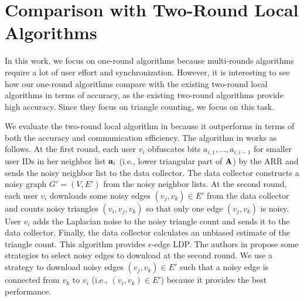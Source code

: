 \section{Comparison with Two-Round Local Algorithms}
\label{chap3-sec:two-round}
In this work, we focus on one-round algorithms because multi-rounds algorithms require a lot of user effort and synchronization.
However, it is interesting to see how our one-round algorithms compare with the existing two-round local algorithms \cite{Imola_USENIX21,Imola_USENIX22} in terms of accuracy, as the existing two-round algorithms provide high accuracy.
Since they focus on triangle counting, we focus on this task.

We evaluate the two-round local algorithm in \cite{Imola_USENIX22} because it outperforms \cite{Imola_USENIX21} in terms of both the accuracy and communication efficiency.
The algorithm in \cite{Imola_USENIX22} works as follows.
At the first round, each user $v_i$ obfuscates bits $a_{i,1}, \ldots, a_{i,i-1}$ for smaller user IDs in her neighbor list $\mathbf{a}_i$ (i.e., lower triangular part of $\mathbf{A}$) by the ARR and sends the noisy neighbor list to the data collector.
The data collector constructs a noisy graph $G'=(V,E')$ from the noisy neighbor lists.
At the second round, each user $v_i$ downloads some noisy edges $(v_j,v_k) \in E'$
from the data collector and counts noisy triangles $(v_i, v_j, v_k)$ so that
only one edge $(v_j, v_k)$ is noisy.
User $v_i$ adds the Laplacian noise to the noisy triangle count and sends it to the data collector.
Finally, the data collector calculates an unbiased estimate of the triangle count.
This algorithm provides $\epsilon$-edge LDP.
The authors in \cite{Imola_USENIX22} propose some strategies to select noisy edges to download at the second round.
We use a strategy to download noisy edges $(v_j,v_k) \in E'$ such that a noisy edge is connected from $v_k$ to $v_i$ (i.e., $(v_i,v_k) \in E'$) because it provides the best performance.

